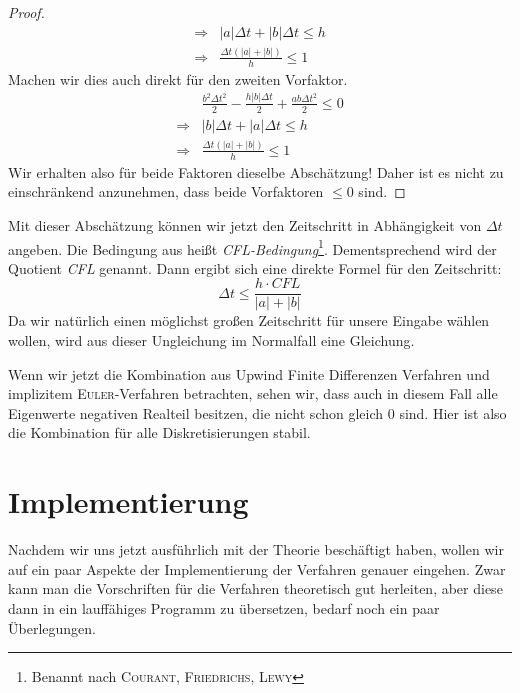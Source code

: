 \documentclass[12pt,a4paper]{scrartcl}
\numberwithin{equation}{section} %
\theoremstyle{definition}
\theoremstyle{plain}
\newcommand{\abs}[1]{\left\vert #1\right\vert}
\begin{document}
\begin{proof}
\begin{align*}
\Rightarrow&\abs{a}\Delta t+\abs{b}\Delta t\le h\\
\Rightarrow&\frac{\Delta t(\abs{a}+\abs{b})}{h}\le 1
\end{align*}
Machen wir dies auch direkt für den zweiten Vorfaktor.
\begin{align*}
&\frac{b^2\Delta t^2}{2}-\frac{h\abs{b}\Delta t}{2}+\frac{ab\Delta t^2}{2}\le 0\\
\Rightarrow&\abs{b}\Delta t+\abs{a}\Delta t\le h\\
\Rightarrow&\frac{\Delta t(\abs{a}+\abs{b})}{h}\le 1
\end{align*}
Wir erhalten also für beide Faktoren dieselbe Abschätzung! Daher ist es nicht zu einschränkend anzunehmen, dass beide Vorfaktoren $\le 0$ sind. 
\end{proof}
Mit dieser Abschätzung können wir jetzt den Zeitschritt in Abhängigkeit von $\Delta t$ angeben. Die Bedingung aus  heißt \emph{CFL-Bedingung}\footnote{Benannt nach \textsc{Courant, Friedrichs, Lewy}}. Dementsprechend wird der Quotient \emph{CFL} genannt. Dann ergibt sich eine direkte Formel für den Zeitschritt:
\begin{equation}
\Delta t\le\frac{h\cdot CFL}{\abs{a}+\abs{b}}
\label{eq:CFLT}
\end{equation}
Da wir natürlich einen möglichst großen Zeitschritt für unsere Eingabe wählen wollen, wird aus dieser Ungleichung im Normalfall eine Gleichung.
\par Wenn wir jetzt die Kombination aus Upwind Finite Differenzen Verfahren und implizitem \textsc{Euler}-Verfahren betrachten, sehen wir, dass auch in diesem Fall alle Eigenwerte negativen Realteil besitzen, die nicht schon gleich $0$ sind. Hier ist also die Kombination für alle Diskretisierungen stabil.
\section{Implementierung}
\label{ch:Impl}
Nachdem wir uns jetzt ausführlich mit der Theorie beschäftigt haben, wollen wir auf ein paar Aspekte der Implementierung der Verfahren genauer eingehen. Zwar kann man die Vorschriften für die Verfahren theoretisch gut herleiten, aber diese dann in ein lauffähiges Programm zu übersetzen, bedarf noch ein paar Überlegungen. 
\end{document}
